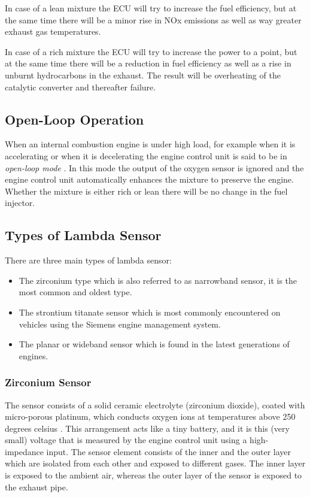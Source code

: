 In case of a lean mixture the ECU will try to increase the fuel efficiency, but at the same time there will be a minor rise in NOx emissions as well as way greater exhaust gas temperatures.
 
In case of a rich mixture the ECU will try to increase the power to a point, but at the same time there will be a reduction in fuel efficiency as well as a rise in unburnt hydrocarbons in the exhaust. The result will be overheating of the catalytic converter and thereafter failure.

 
\subsection{Open-Loop Operation}
When an internal combustion engine is under high load, for example when it is accelerating or when it is decelerating the engine control unit is said to be in \textit{open-loop mode} \cite{richter2006understanding}. In this mode the output of the oxygen sensor is ignored and the engine control unit automatically enhances the mixture to preserve the engine. Whether the mixture is either rich or lean there will be no change in the fuel injector.


\subsection{Types of Lambda Sensor}
There are three main types of lambda sensor:
\begin{itemize}
\item The zirconium type which is also referred to as narrowband sensor, it is the most common and oldest type.
\item The strontium titanate sensor which is most commonly encountered on vehicles using the Siemens engine management system.
\item The planar or wideband sensor which is found in the latest generations of engines.
\end{itemize}

\subsubsection*{Zirconium Sensor}
The sensor consists of a solid ceramic electrolyte (zirconium dioxide), coated with micro-porous platinum, which conducts oxygen ions at temperatures above 250 degrees celsius \cite{1622233}. This arrangement acts like a tiny battery, and it is this (very small) voltage that is measured by the engine control unit using a high-impedance input. The sensor element consists of the inner and the outer layer which are isolated from each other and exposed to different gases. The inner layer is exposed to the ambient air, whereas the outer layer of the sensor is exposed to the exhaust pipe.

